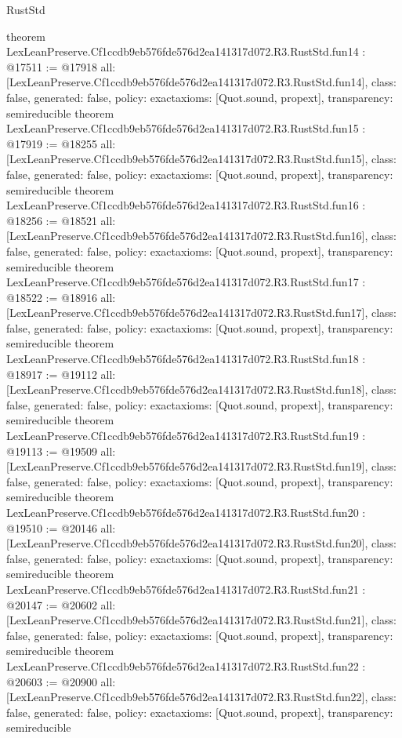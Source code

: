 \begin{lexlean}{RustStd}
\begin{coremodule}
{}
theorem LexLeanPreserve.Cf1ccdb9eb576fde576d2ea141317d072.R3.RustStd.fun14 : @17511 := @17918 {
  all: [LexLeanPreserve.Cf1ccdb9eb576fde576d2ea141317d072.R3.RustStd.fun14],
  class: false,
  generated: false,
  policy: exact{axioms: [Quot.sound, propext]},
  transparency: semireducible
}
theorem LexLeanPreserve.Cf1ccdb9eb576fde576d2ea141317d072.R3.RustStd.fun15 : @17919 := @18255 {
  all: [LexLeanPreserve.Cf1ccdb9eb576fde576d2ea141317d072.R3.RustStd.fun15],
  class: false,
  generated: false,
  policy: exact{axioms: [Quot.sound, propext]},
  transparency: semireducible
}
theorem LexLeanPreserve.Cf1ccdb9eb576fde576d2ea141317d072.R3.RustStd.fun16 : @18256 := @18521 {
  all: [LexLeanPreserve.Cf1ccdb9eb576fde576d2ea141317d072.R3.RustStd.fun16],
  class: false,
  generated: false,
  policy: exact{axioms: [Quot.sound, propext]},
  transparency: semireducible
}
theorem LexLeanPreserve.Cf1ccdb9eb576fde576d2ea141317d072.R3.RustStd.fun17 : @18522 := @18916 {
  all: [LexLeanPreserve.Cf1ccdb9eb576fde576d2ea141317d072.R3.RustStd.fun17],
  class: false,
  generated: false,
  policy: exact{axioms: [Quot.sound, propext]},
  transparency: semireducible
}
theorem LexLeanPreserve.Cf1ccdb9eb576fde576d2ea141317d072.R3.RustStd.fun18 : @18917 := @19112 {
  all: [LexLeanPreserve.Cf1ccdb9eb576fde576d2ea141317d072.R3.RustStd.fun18],
  class: false,
  generated: false,
  policy: exact{axioms: [Quot.sound, propext]},
  transparency: semireducible
}
theorem LexLeanPreserve.Cf1ccdb9eb576fde576d2ea141317d072.R3.RustStd.fun19 : @19113 := @19509 {
  all: [LexLeanPreserve.Cf1ccdb9eb576fde576d2ea141317d072.R3.RustStd.fun19],
  class: false,
  generated: false,
  policy: exact{axioms: [Quot.sound, propext]},
  transparency: semireducible
}
theorem LexLeanPreserve.Cf1ccdb9eb576fde576d2ea141317d072.R3.RustStd.fun20 : @19510 := @20146 {
  all: [LexLeanPreserve.Cf1ccdb9eb576fde576d2ea141317d072.R3.RustStd.fun20],
  class: false,
  generated: false,
  policy: exact{axioms: [Quot.sound, propext]},
  transparency: semireducible
}
theorem LexLeanPreserve.Cf1ccdb9eb576fde576d2ea141317d072.R3.RustStd.fun21 : @20147 := @20602 {
  all: [LexLeanPreserve.Cf1ccdb9eb576fde576d2ea141317d072.R3.RustStd.fun21],
  class: false,
  generated: false,
  policy: exact{axioms: [Quot.sound, propext]},
  transparency: semireducible
}
theorem LexLeanPreserve.Cf1ccdb9eb576fde576d2ea141317d072.R3.RustStd.fun22 : @20603 := @20900 {
  all: [LexLeanPreserve.Cf1ccdb9eb576fde576d2ea141317d072.R3.RustStd.fun22],
  class: false,
  generated: false,
  policy: exact{axioms: [Quot.sound, propext]},
  transparency: semireducible
}
\end{coremodule}
\end{lexlean}
